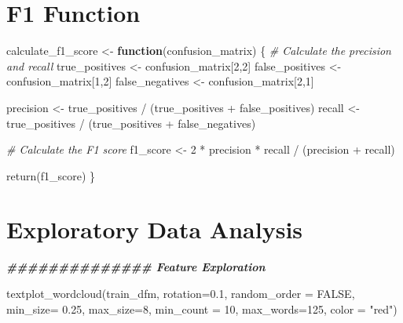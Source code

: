 \documentclass[
]{article}
\newenvironment{Shaded}{\begin{snugshade}}{\end{snugshade}}
\newcommand{\AttributeTok}[1]{\textcolor[rgb]{0.77,0.63,0.00}{#1}}
\newcommand{\CommentTok}[1]{\textcolor[rgb]{0.56,0.35,0.01}{\textit{#1}}}
\newcommand{\ConstantTok}[1]{\textcolor[rgb]{0.00,0.00,0.00}{#1}}
\newcommand{\ControlFlowTok}[1]{\textcolor[rgb]{0.13,0.29,0.53}{\textbf{#1}}}
\newcommand{\DecValTok}[1]{\textcolor[rgb]{0.00,0.00,0.81}{#1}}
\newcommand{\DocumentationTok}[1]{\textcolor[rgb]{0.56,0.35,0.01}{\textbf{\textit{#1}}}}
\newcommand{\FloatTok}[1]{\textcolor[rgb]{0.00,0.00,0.81}{#1}}
\newcommand{\FunctionTok}[1]{\textcolor[rgb]{0.00,0.00,0.00}{#1}}
\newcommand{\NormalTok}[1]{#1}
\newcommand{\OtherTok}[1]{\textcolor[rgb]{0.56,0.35,0.01}{#1}}
\newcommand{\SpecialCharTok}[1]{\textcolor[rgb]{0.00,0.00,0.00}{#1}}
\newcommand{\StringTok}[1]{\textcolor[rgb]{0.31,0.60,0.02}{#1}}
\begin{document}
\hypertarget{f1-function}{%
\section{F1 Function}\label{f1-function}}

\begin{Shaded}
\begin{Highlighting}[]
\NormalTok{calculate\_f1\_score }\OtherTok{\textless{}{-}} \ControlFlowTok{function}\NormalTok{(confusion\_matrix) \{}
  \CommentTok{\# Calculate the precision and recall}
\NormalTok{  true\_positives }\OtherTok{\textless{}{-}}\NormalTok{ confusion\_matrix[}\DecValTok{2}\NormalTok{,}\DecValTok{2}\NormalTok{]}
\NormalTok{  false\_positives }\OtherTok{\textless{}{-}}\NormalTok{ confusion\_matrix[}\DecValTok{1}\NormalTok{,}\DecValTok{2}\NormalTok{]}
\NormalTok{  false\_negatives }\OtherTok{\textless{}{-}}\NormalTok{ confusion\_matrix[}\DecValTok{2}\NormalTok{,}\DecValTok{1}\NormalTok{]}
  
\NormalTok{  precision }\OtherTok{\textless{}{-}}\NormalTok{ true\_positives }\SpecialCharTok{/}\NormalTok{ (true\_positives }\SpecialCharTok{+}\NormalTok{ false\_positives)}
\NormalTok{  recall }\OtherTok{\textless{}{-}}\NormalTok{ true\_positives }\SpecialCharTok{/}\NormalTok{ (true\_positives }\SpecialCharTok{+}\NormalTok{ false\_negatives)}
  
  \CommentTok{\# Calculate the F1 score}
\NormalTok{  f1\_score }\OtherTok{\textless{}{-}} \DecValTok{2} \SpecialCharTok{*}\NormalTok{ precision }\SpecialCharTok{*}\NormalTok{ recall }\SpecialCharTok{/}\NormalTok{ (precision }\SpecialCharTok{+}\NormalTok{ recall)}
  
  \FunctionTok{return}\NormalTok{(f1\_score)}
\NormalTok{\}}
\end{Highlighting}
\end{Shaded}

\hypertarget{exploratory-data-analysis}{%
\section{Exploratory Data Analysis}\label{exploratory-data-analysis}}

\begin{Shaded}
\begin{Highlighting}[]
\DocumentationTok{\#\#\#\#\#\#\#\#\#\#\#\#\#\# Feature Exploration }

\FunctionTok{textplot\_wordcloud}\NormalTok{(train\_dfm, }\AttributeTok{rotation=}\FloatTok{0.1}\NormalTok{, }\AttributeTok{random\_order =} \ConstantTok{FALSE}\NormalTok{, }\AttributeTok{min\_size=} \FloatTok{0.25}\NormalTok{, }\AttributeTok{max\_size=}\DecValTok{8}\NormalTok{, }\AttributeTok{min\_count =} \DecValTok{10}\NormalTok{, }\AttributeTok{max\_words=}\DecValTok{125}\NormalTok{, }\AttributeTok{color =} \StringTok{"red"}\NormalTok{)}
\end{Highlighting}
\end{Shaded}
\end{document}

